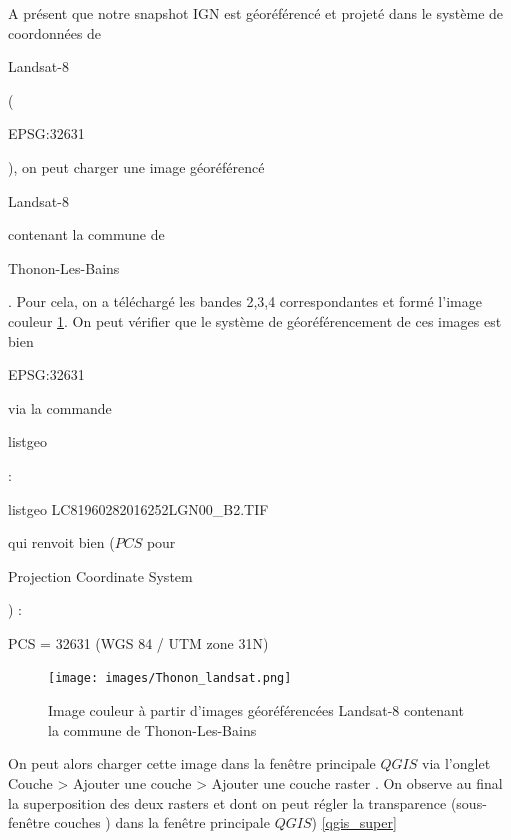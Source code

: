 \documentclass{book}
\begin{document}
A présent que notre snapshot IGN est géoréférencé et projeté dans le système de coordonnées de \begin{itshape}Landsat-8\end{itshape}
(\begin{itshape}EPSG:32631\end{itshape}), on peut charger une image géoréférencé \begin{itshape}Landsat-8\end{itshape} contenant la 
commune de \begin{itshape}Thonon-Les-Bains\end{itshape}. Pour cela, on a téléchargé les bandes 2,3,4 correspondantes et formé l'image 
couleur  \ref{Thonon-landsat}. On peut vérifier que le système de géoréférencement de ces images est bien \begin{itshape}EPSG:32631\end{itshape} via la 
commande \begin{itshape}listgeo\end{itshape}:\\

\begin{center}
listgeo LC81960282016252LGN00\_B2.TIF
\end{center}

qui renvoit bien ($PCS$ pour \begin{itshape}Projection Coordinate System\end{itshape}) :\\

\begin{center}
PCS = 32631 (WGS 84 / UTM zone 31N)\\
\end{center}

\begin{figure}[H]
\begin{center}
\texttt{[image: images/Thonon\_landsat.png]}
\end{center}
\caption{Image couleur à partir d'images géoréférencées Landsat-8 contenant la commune de Thonon-Les-Bains}
\label{Thonon-landsat}
\end{figure}

\clearpage

On peut alors charger cette image dans la fenêtre principale $QGIS$ via l'onglet \og Couche > Ajouter une couche > Ajouter une couche 
raster \fg{}. On observe au final la superposition des deux rasters et dont on peut régler la transparence (sous-fen\^{e}tre \og couches \fg{}) 
dans la fen\^{e}tre principale $QGIS$) \ref{qgis_super}
\end{document}
